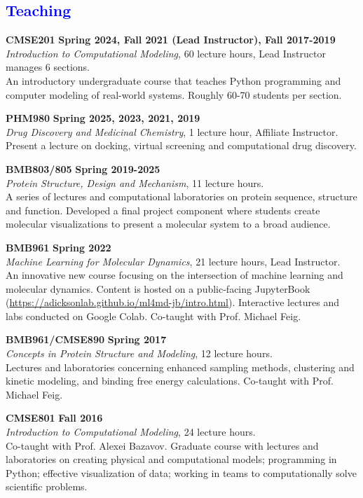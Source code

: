 \documentclass[margin,line]{res}
\begin{document}
\begin{resume}
\section{\sc \textcolor{blue}{ Teaching }}
{\bf CMSE201} \hfill {\bf Spring 2024, Fall 2021 (Lead Instructor), Fall 2017-2019} \\
\emph{Introduction to Computational Modeling}, 60 lecture hours, Lead Instructor manages 6 sections.\\
An introductory undergraduate course that teaches Python programming and computer modeling of real-world systems. Roughly 60-70 students per section.

{\bf PHM980} \hfill {\bf Spring 2025, 2023, 2021, 2019} \\
\emph{Drug Discovery and Medicinal Chemistry}, 1 lecture hour, Affiliate Instructor.\\
Present a lecture on docking, virtual screening and computational drug discovery.

{\bf BMB803/805} \hfill {\bf Spring 2019-2025} \\
\emph{Protein Structure, Design and Mechanism}, 11 lecture hours.\\
A series of lectures and computational laboratories on protein sequence, structure and function.  Developed a final project component where students create molecular visualizations to present a molecular system to a broad audience.

{\bf BMB961} \hfill {\bf Spring 2022}\\
\emph{Machine Learning for Molecular Dynamics}, 21 lecture hours, Lead Instructor.\\
An innovative new course focusing on the intersection of machine learning and molecular dynamics.  Content is hosted on a public-facing JupyterBook (\url{https://adicksonlab.github.io/ml4md-jb/intro.html}).  Interactive lectures and labs conducted on Google Colab.  Co-taught with Prof. Michael Feig.

{\bf BMB961/CMSE890} \hfill {\bf Spring 2017} \\
\emph{Concepts in Protein Structure and Modeling}, 12 lecture hours.\\
Lectures and laboratories concerning enhanced sampling methods, clustering and kinetic modeling, and binding free energy calculations. Co-taught with Prof. Michael Feig.

{\bf CMSE801} \hfill {\bf Fall 2016} \\
\emph{Introduction to Computational Modeling}, 24 lecture hours.\\
Co-taught with Prof. Alexei Bazavov.
Graduate course with lectures and laboratories on creating physical and computational models; programming in Python; effective visualization of data; working in teams to computationally solve scientific problems.


\end{resume}
\end{document}
